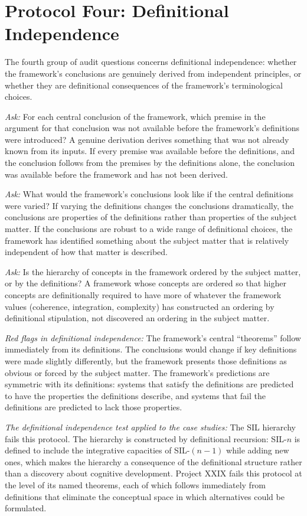 \documentclass[12pt, openright, twoside]{book}
\begin{document}
\section{Protocol Four: Definitional Independence}

The fourth group of audit questions concerns definitional independence:
whether the framework's conclusions are genuinely derived from independent
principles, or whether they are definitional consequences of the framework's
terminological choices.

\textit{Ask:} For each central conclusion of the framework, which premise
in the argument for that conclusion was not available before the framework's
definitions were introduced? A genuine derivation derives something that
was not already known from its inputs. If every premise was available before
the definitions, and the conclusion follows from the premises by the definitions
alone, the conclusion was available before the framework and has not been
derived.

\textit{Ask:} What would the framework's conclusions look like if the central
definitions were varied? If varying the definitions changes the conclusions
dramatically, the conclusions are properties of the definitions rather than
properties of the subject matter. If the conclusions are robust to a wide
range of definitional choices, the framework has identified something about
the subject matter that is relatively independent of how that matter is
described.

\textit{Ask:} Is the hierarchy of concepts in the framework ordered by
the subject matter, or by the definitions? A framework whose concepts are
ordered so that higher concepts are definitionally required to have more
of whatever the framework values (coherence, integration, complexity)
has constructed an ordering by definitional stipulation, not discovered
an ordering in the subject matter.

\textit{Red flags in definitional independence:} The framework's central
``theorems'' follow immediately from its definitions. The conclusions would
change if key definitions were made slightly differently, but the framework
presents those definitions as obvious or forced by the subject matter.
The framework's predictions are symmetric with its definitions: systems
that satisfy the definitions are predicted to have the properties the
definitions describe, and systems that fail the definitions are predicted
to lack those properties.

\textit{The definitional independence test applied to the case studies:}
The SIL hierarchy fails this protocol. The hierarchy is constructed by
definitional recursion: SIL-$n$ is defined to include the integrative
capacities of SIL-$(n-1)$ while adding new ones, which makes the hierarchy
a consequence of the definitional structure rather than a discovery about
cognitive development. Project XXIX fails this protocol at the level of
its named theorems, each of which follows immediately from definitions
that eliminate the conceptual space in which alternatives could be
formulated.
\end{document}
